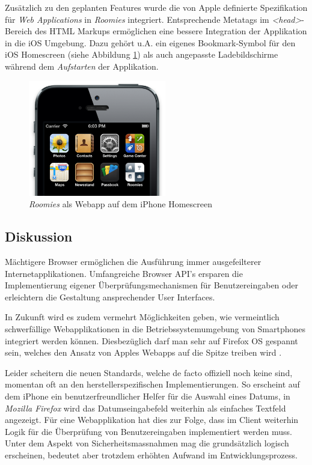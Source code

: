 Zusätzlich zu den geplanten Features wurde die von Apple definierte Spezifikation für \emph{Web Applications} \cite{SafariWebApp} in \emph{Roomies} integriert. Entsprechende Metatags im \emph{<head>}-Bereich des HTML Markups ermöglichen eine bessere Integration der Applikation in die iOS Umgebung. Dazu gehört u.A. ein eigenes Bookmark-Symbol für den iOS Homescreen (siehe Abbildung \ref{fig:webapp-homescreen-icon}) als auch angepasste Ladebildschirme während dem \emph{Aufstarten} der Applikation.

\begin{figure}[H]
	\centering
	\includegraphics[width=6cm]{content/principle-demonstration/images/ios-webapp-homescreenicon.png}
	\caption{\emph{Roomies} als Webapp auf dem iPhone Homescreen}
	\label{fig:webapp-homescreen-icon}
\end{figure}


\subsection*{Diskussion}

Mächtigere Browser ermöglichen die Ausführung immer ausgefeilterer Internetapplikationen. Umfangreiche Browser API's ersparen die Implementierung eigener Überprüfungsmechanismen für Benutzereingaben oder erleichtern die Gestaltung ansprechender User Interfaces.

In Zukunft wird es zudem vermehrt Möglichkeiten geben, wie vermeintlich schwerfällige Webapplikationen in die Betriebssystemumgebung von Smartphones integriert werden können. Diesbezüglich darf man sehr auf Firefox OS gespannt sein, welches den Ansatz von Apples Webapps auf die Spitze treiben wird \cite{FirefoxOSWebApp}.

Leider scheitern die neuen Standards, welche de facto offiziell noch keine sind, momentan oft an den herstellerspezifischen Implementierungen. So erscheint auf dem iPhone ein benutzerfreundlicher Helfer für die Auswahl eines Datums, in \emph{Mozilla Firefox} \cite{CanIUseDateInput} wird das Datumseingabefeld weiterhin als einfaches Textfeld angezeigt. Für eine Webapplikation hat dies zur Folge, dass im Client weiterhin Logik für die Überprüfung von Benutzereingaben implementiert werden muss. Unter dem Aspekt von Sicherheitsmassnahmen mag die grundsätzlich logisch erscheinen, bedeutet aber trotzdem erhöhten Aufwand im Entwicklungsprozess.

